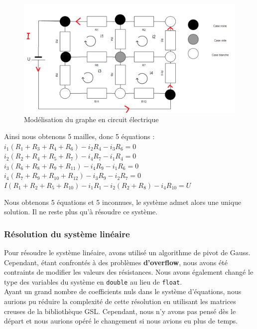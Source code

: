 \documentclass{article}
\begin{document}
\begin{figure}[H]
    \centering
    \includegraphics[width = 13cm]{resistance.png}
    \caption{Modélisation du graphe en circuit électrique}
    \label{circuit}
\end{figure}
\noindent Ainsi nous obtenons 5 mailles, donc 5 équations :\\
\indent $i_1(R_1+R_3+R_4+R_6)-i_2R_4-i_3R_6=0$\\
\indent $i_2(R_2+R_4+R_5+R_7)-i_4R_7-i_1R_4=0$\\
\indent $i_3(R_6+R_8+R_9+R_{11})-i_4R_9-i_1R_6=0$\\
\indent $i_4(R_7+R_9+R_{10}+R_{12})-i_3R_9-i_2R_7=0$\\
\indent $I(R_1+R_2+R_5+R_{10})-i_1R_1-i_2(R_2+R_8)-i_4R_{10}=U$

Nous obtenons 5 équations et 5 inconnues, le système admet alors une unique solution. Il ne reste plus qu'à résoudre ce système.

\subsubsection{Résolution du système linéaire}

Pour résoudre le système linéaire, avons utilisé un algorithme de pivot de Gauss. Cependant, étant confrontés à des problèmes \textbf{d'overflow}, nous avons été contraints de modifier les valeurs des résistances. Nous avons également changé le type des variables du système en \lstinline{double} au lieu de \lstinline{float}. \\
Ayant un grand nombre de coefficients nuls dans le système d'équations, nous aurions pu réduire la complexité de cette résolution en utilisant les matrices creuses de la bibliothèque GSL. Cependant, nous n'y avons pas pensé dès le départ et nous aurions opéré le changement si nous avions eu plus de temps.
\end{document}
